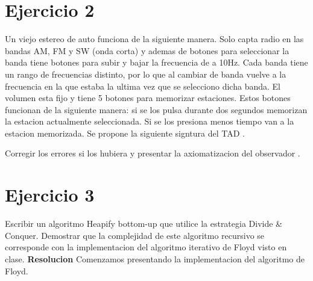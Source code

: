 \documentclass[10pt,a4paper]{article}
\begin{document}
\section{Ejercicio 2}

Un viejo estereo de auto funciona de la siguiente manera. Solo capta radio en las bandas AM, FM y SW (onda corta) y ademas de botones para seleccionar la banda tiene botones para subir y bajar la frecuencia de a 10Hz. Cada banda tiene un rango de frecuencias distinto, por lo que al cambiar de banda vuelve a la frecuencia en la que estaba la ultima vez que se selecciono dicha banda. El volumen esta fijo y tiene 5 botones para memorizar estaciones. Estos botones funcionan de la siguiente manera: si se los pulsa durante dos segundos memorizan la estacion actualmente seleccionada. Si se los presiona menos tiempo van a la estacion memorizada. Se propone la siguiente signtura del TAD .
\newline
\newline
\begin{tad}{}
	\medskip	
	\tadObservadores
	\medskip
	\medskip
	\medskip
	
	\tadGeneradores
	\medskip
	\medskip
	\medskip
	\medskip
	\medskip
	\medskip
	\medskip
	
	\tadAxiomas[$\forall$]
	
	\medskip
	\medskip
	\medskip
	\medskip

\end{tad}

Corregir los errores si los hubiera y presentar la axiomatizacion del observador .
\newpage

\section{Ejercicio 3}

Escribir un algoritmo Heapify bottom-up que utilice la estrategia Divide \& Conquer. Demostrar que la complejidad de este algoritmo recursivo se corresponde con la implementacion del algoritmo iterativo de Floyd visto en clase.
\newline
\newline
\textbf{Resolucion}
\newline
\newline
Comenzamos presentando la implementacion del algoritmo de Floyd.
\end{document}
